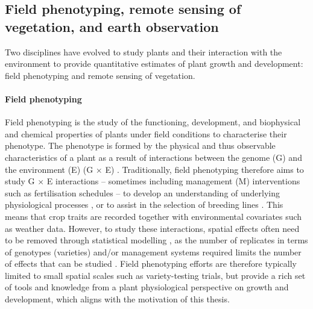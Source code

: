 \subsection{Field phenotyping, remote sensing of vegetation, and earth observation}
\label{subsec:field-phenotyping-rs-eo}

Two disciplines have evolved to study plants and their interaction with the environment to provide quantitative estimates of plant growth and development: field phenotyping and remote sensing of vegetation.

\paragraph{Field phenotyping}
Field phenotyping is the study of the functioning, development, and biophysical and chemical properties of plants under field conditions \citep{walter_plant_2015} to characterise their phenotype. The phenotype is formed by the physical and thus observable characteristics of a plant as a result of interactions between the genome (G) and the environment (E) (G $\times$ E) \citep{johannsen_genotype_1911}. Traditionally, field phenotyping therefore aims to study G $\times$ E interactions -- sometimes including management (M) interventions such as fertilisation schedules \citep[for instance]{rodene_uavbased_2022} -- to develop an understanding of underlying physiological processes \citep{york_functional_2019}, or to assist in the selection of breeding lines \citep{pask_physiological_2012,roth_image-based_2023}. This means that crop traits are recorded together with environmental covariates such as weather data. However, to study these interactions, spatial effects often need to be removed through statistical modelling \citep{piepho_twodimensional_2022}, as the number of replicates in terms of genotypes (varieties) and/or management systems required limits the number of effects that can be studied \citep{poorter_plant_1996}. Field phenotyping efforts are therefore typically limited to small spatial scales such as variety-testing trials, but provide a rich set of tools and knowledge from a plant physiological perspective on growth and development, which aligns with the motivation of this thesis.

